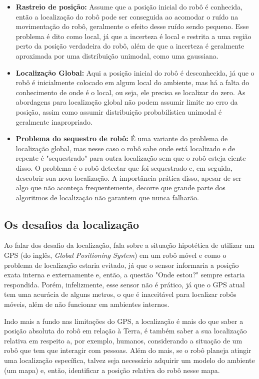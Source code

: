 \documentclass[acronym, symbols, table]{fei}
\begin{document}
			\begin{itemize}
				\item \textbf{Rastreio de posição:} Assume que a posição inicial do robô é conhecida, então a localização do robô pode ser conseguida ao acomodar o ruído na movimentação do robô, geralmente o efeito desse ruído sendo pequeno. Esse problema é dito como local, já que a incerteza é local e restrita a uma região perto da posição verdadeira do robô, além de que a incerteza é geralmente aproximada por uma distribuição unimodal, como uma gaussiana.
				
				\item \textbf{Localização Global:} Aqui a posição inicial do robô é desconhecida, já que o robô é inicialmente colocado em algum local do ambiente, mas há a falta do conhecimento de onde é o local, ou seja, ele precisa se localizar do zero. As abordagens para localização global não podem assumir limite no erro da posição, assim como assumir distribuição probabilística unimodal é geralmente inapropriado.
				
				\item \textbf{Problema do sequestro de robô:} É uma variante do problema de localização global, mas nesse caso o robô sabe onde está localizado e de repente é "sequestrado" para outra localização sem que o robô esteja ciente disso. O problema é o robô detectar que foi sequestrado e, em seguida, descobrir sua nova localização. A importância prática disso, apesar de ser algo que não aconteça frequentemente, decorre que grande parte dos algoritmos de localização não garantem que nunca falharão.
			\end{itemize}
			
		\subsection{Os desafios da localização}
		
			Ao falar dos desafio da localização, \textcite{siegwart2011introduction} fala sobre a situação hipotética de utilizar um GPS (do inglês, \textit{Global Positioning System}) em um robô móvel e como o problema de localização estaria evitado, já que o sensor informaria a posição exata interna e externamente e, então, a questão "Onde estou?" sempre estaria respondida. Porém, infelizmente, esse sensor não é prático, já que o GPS atual tem uma acurácia de alguns metros, o que é inaceitável para localizar robôs móveis, além de não funcionar em ambientes internos. 
			
			Indo mais a fundo nas limitações do GPS, a localização é mais do que saber a posição absoluta do robô em relação à Terra, é também saber a sua localização relativa em respeito a, por exemplo, humanos, considerando a situação de um robô que tem que interagir com pessoas. Além do mais, se o robô planeja atingir uma localização específica, talvez seja necessário adquirir um modelo do ambiente (um mapa) e, então, identificar a posição relativa do robô nesse mapa. 
			
\end{document}
